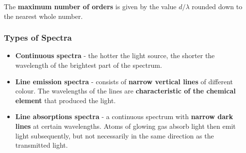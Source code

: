 The \textbf{maximum number of orders} is given by the value $d/\lambda$ rounded down to the nearest whole number.

\subsubsection*{Types of Spectra}

\begin{itemize}
    \item \textbf{Continuous spectra} - the hotter the light source, the shorter the wavelength of the brightest part of the spectrum.
    \item \textbf{Line emission spectra} - consists of \textbf{narrow vertical lines} of different colour. The wavelengths of the lines are \textbf{characteristic of the chemical element} that produced the light.
    \item \textbf{Line absorptions spectra} - a continuous spectrum with \textbf{narrow dark lines} at certain wavelengths. Atoms of glowing gas absorb light then emit light subsequently, but not necessarily in the same direction as the transmitted light.
\end{itemize}
